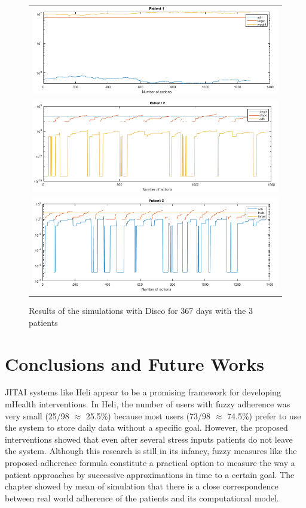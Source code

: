 \documentclass{llncs}
\begin{document}
\begin{figure}
  \begin{center}
  \begin{tabular}{c}
    \includegraphics[scale=0.5]{Patient1-365-fuzzy.png}\\
    \includegraphics[scale=0.5]{Patient2-365-fuzzy.png}\\
    \includegraphics[scale=0.5]{Patient3-365-fuzzy.png}\\
    \end{tabular}
    \caption{Results of the simulations with Disco for 367 days with the 3 patients}
     \label{Fig.TimeSeries}
\end{center}
\end{figure} 

\section {Conclusions and Future Works}
\label{sec.conclusions}

JITAI systems like Heli appear to be a promising framework for developing mHealth interventions. In Heli, the number of users with fuzzy adherence was very small (25/98 $\approx$ 25.5\%) because most users (73/98 $\approx$ 74.5\%) prefer to use the system to store daily data without a specific goal. However, the  proposed interventions showed that even after several stress inputs patients do not leave the system. Although this research is still in its infancy, fuzzy measures like the proposed adherence formula constitute a practical option  to measure the way a patient approaches by successive approximations in time to a certain goal. The chapter showed by mean of simulation that there is a close correspondence between real world adherence of the patients and its computational model. 
\end{document}
